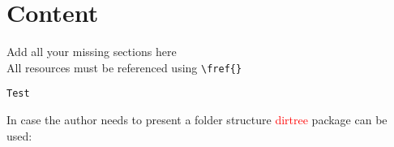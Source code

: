
\section{Content}

Add all your missing sections here \\






All resources must be referenced using \lstinline[basicstyle=\small\ttfamily]|\fref{}|


\begin{lstlisting}[caption={test},label={lst:test}]
Test
\end{lstlisting}

In case the author needs to present a folder structure \textcolor{red}{dirtree} package can be used:

